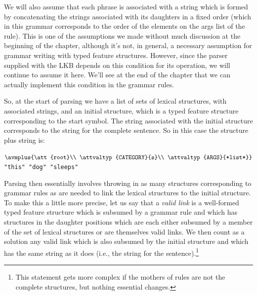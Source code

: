 \documentclass[12pt]{report}
\newcommand{\newterm}[1]{{\it #1}}
\begin{document}
We will
also assume that each phrase is associated with a string
which is formed by concatenating the strings associated with 
its daughters in a fixed order (which in this grammar corresponds
to the order of the elements on the {\feature args} list of the rule).
This is one of the assumptions we made without much discussion
at the beginning of the chapter, although it's not, in general,
a necessary assumption
for grammar writing with typed feature structures.
However, since the parser supplied with the LKB
depends on this condition for its operation, we will continue to
assume it here.  We'll see at the end of the chapter that
we can actually implement this condition in the grammar rules.

So, at the start of parsing we have a list of sets of
lexical structures, with associated strings, and an initial structure,
which is a typed feature structure corresponding to the start
symbol.  The string associated with the initial structure
corresponds to the string for the complete sentence.  So
in this case the structure plus string is:
\begin{center}
{\tiny $\avmplus{\att{root}\\
\attvaltyp{CATEGORY}{s}\\
\attvaltyp{ARGS}{*list*}}$}\\[0.1in]
{\tt "this" "dog" "sleeps"}
\end{center}
Parsing then essentially involves
throwing in as many structures corresponding to
grammar rules as are needed to link
the lexical structures
to the initial structure.
To make this a little more precise,
let us say that a \newterm{valid link}
is a well-formed typed feature structure
which is subsumed by a grammar rule
and which has structures in the daughter positions
which are each either subsumed by a member of the set of lexical
structures or are themselves valid links.
We then count as a solution any valid link which is
also subsumed by the initial structure and which
has the same string as it does
(i.e., the string for the sentence).\footnote{This
statement gets more complex if the mothers of rules are
not the complete structures, but nothing essential changes.}
\end{document}

